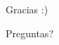 \documentclass{beamer}
\begin{document}
     \begin{frame}
       \begin{center}
 	Gracias :)
 	
 	\vspace{2cm}

 	Preguntas?
       \end{center}
     \end{frame}    
\end{document}
